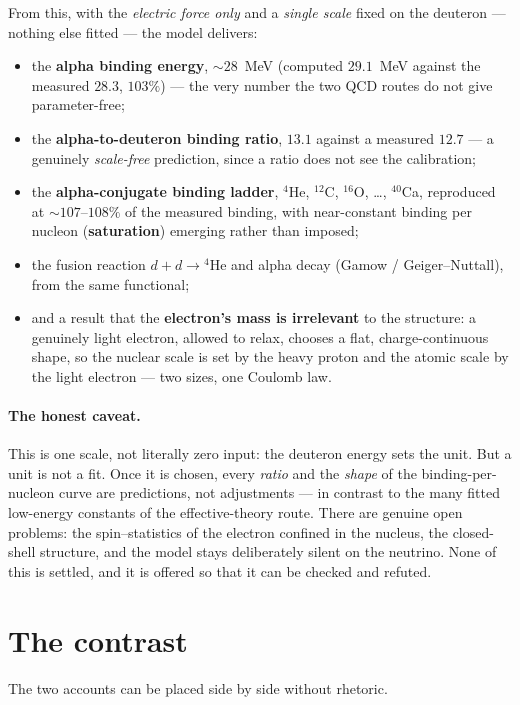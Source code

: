 \documentclass[11pt]{article}
\begin{document}
From this, with the \emph{electric force only} and a \emph{single scale} fixed on the deuteron ---
nothing else fitted --- the model delivers:
\begin{itemize}
\item the \textbf{alpha binding energy}, $\sim 28$~MeV (computed $29.1$~MeV against the measured $28.3$,
  $103\%$) --- the very number the two QCD routes do not give parameter-free;
\item the \textbf{alpha-to-deuteron binding ratio}, $13.1$ against a measured $12.7$ --- a genuinely
  \emph{scale-free} prediction, since a ratio does not see the calibration;
\item the \textbf{alpha-conjugate binding ladder}, ${}^4$He, ${}^{12}$C, ${}^{16}$O, \dots, ${}^{40}$Ca,
  reproduced at $\sim 107$--$108\%$ of the measured binding, with near-constant binding per nucleon
  (\textbf{saturation}) emerging rather than imposed;
\item the fusion reaction $d+d\to{}^4$He and alpha decay (Gamow / Geiger--Nuttall), from the same
  functional;
\item and a result that the \textbf{electron's mass is irrelevant} to the structure: a genuinely light
  electron, allowed to relax, chooses a flat, charge-continuous shape, so the nuclear scale is set by the
  heavy proton and the atomic scale by the light electron --- two sizes, one Coulomb law.
\end{itemize}

\paragraph{The honest caveat.} This is one scale, not literally zero input: the deuteron energy sets the
unit. But a unit is not a fit. Once it is chosen, every \emph{ratio} and the \emph{shape} of the
binding-per-nucleon curve are predictions, not adjustments --- in contrast to the many fitted low-energy
constants of the effective-theory route. There are genuine open problems: the spin--statistics of the
electron confined in the nucleus, the closed-shell structure, and the model stays deliberately silent on
the neutrino. None of this is settled, and it is offered so that it can be checked and refuted.

\section{The contrast}
\label{sec:contrast}

The two accounts can be placed side by side without rhetoric.
\end{document}
